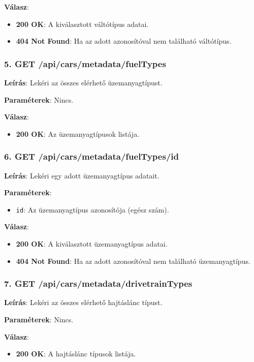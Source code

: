 \documentclass{report}[11pt]
\begin{document}
\textbf{Válasz}:  
\begin{itemize}
    \item \textbf{200 OK}: A kiválasztott váltótípus adatai.
    \item \textbf{404 Not Found}: Ha az adott azonosítóval nem található váltótípus.
\end{itemize}

\subsubsection{5. GET /api/cars/metadata/fuelTypes}

\textbf{Leírás}:  
Lekéri az összes elérhető üzemanyagtípust.

\textbf{Paraméterek}:  
Nincs.

\textbf{Válasz}:  
\begin{itemize}
    \item \textbf{200 OK}: Az üzemanyagtípusok listája.
\end{itemize}

\subsubsection{6. GET /api/cars/metadata/fuelTypes/{id}}

\textbf{Leírás}:  
Lekéri egy adott üzemanyagtípus adatait.

\textbf{Paraméterek}:  
\begin{itemize}
    \item \texttt{id}: Az üzemanyagtípus azonosítója (egész szám).
\end{itemize}

\textbf{Válasz}:  
\begin{itemize}
    \item \textbf{200 OK}: A kiválasztott üzemanyagtípus adatai.
    \item \textbf{404 Not Found}: Ha az adott azonosítóval nem található üzemanyagtípus.
\end{itemize}

\subsubsection{7. GET /api/cars/metadata/drivetrainTypes}

\textbf{Leírás}:  
Lekéri az összes elérhető hajtáslánc típust.

\textbf{Paraméterek}:  
Nincs.

\textbf{Válasz}:  
\begin{itemize}
    \item \textbf{200 OK}: A hajtáslánc típusok listája.
\end{itemize}
\end{document}
